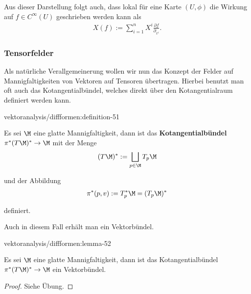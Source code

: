 \documentclass[letterpaper,10pt,english]{jupyterBook}
\begin{document}
\par
Aus dieser Darstellung folgt auch, dass lokal für eine Karte \((U,\phi)\) die Wirkung auf \(f\in C^\infty(U)\) geschrieben werden kann als
\begin{align*}
X(f) := \sum_{i=1}^n X^i \frac{\partial f}{\partial_{x^i}}.
\end{align*}

\subsubsection{Tensorfelder}
\label{\detokenize{vektoranalysis/diffformen:tensorfelder}}
\par
Als natürliche Verallgemeinerung wollen wir nun das Konzept der Felder auf Mannigfaltigkeiten von Vektoren auf Tensoren übertragen. Hierbei benutzt man oft auch das Kotangentialbündel, welches direkt über den Kotangentialraum definiert werden kann.
\begin{definition}{}{vektoranalysis/diffformen:definition-51}



\par
Es sei \(\M\) eine glatte Mannigfaltigkeit, dann ist das \textbf{Kotangentialbündel} \(\pi^\ast (T\M)^\ast\to\M\) mit der Menge
\begin{align*}
(T\M)^\ast := \bigsqcup_{p\in\M} T_p\M
\end{align*}
\par
und der Abbildung
\begin{align*}
\pi^{\ast}(p , v):= T_p^\ast\M = (T_p\M)^\ast
\end{align*}
\par
definiert.
\end{definition}

\par
Auch in diesem Fall erhält man ein Vektorbündel.
\begin{lemma}{}{vektoranalysis/diffformen:lemma-52}



\par
Es sei \(\M\) eine glatte Mannigfaltigkeit, dann ist das Kotangentialbündel \(\pi^\ast (T\M)^\ast\to\M\) ein Vektorbündel.
\end{lemma}

\begin{proof}
 Siehe Übung.
\end{proof}
\end{document}
